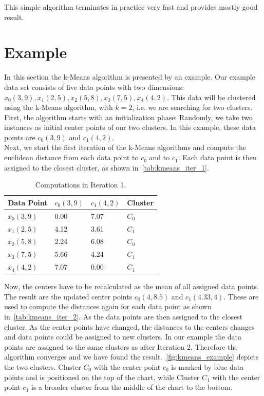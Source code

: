 This simple algorithm terminates in practice very fast and provides mostly good result.

\section{Example}

In this section the k-Means algorithm is presented by an example. Our example data set consists of five data points with two dimensions: $x_0(3,9), x_1(2,5), x_2(5,8), x_3(7,5), x_4(4,2)$. This data will be clustered using the k-Means algorithm, with $k = 2$, i.e. we are searching for two clusters. First, the algorithm starts with an initialization phase: Randomly, we take two instances as initial center points of our two clusters. In this example, these data points are $c_0(3,9)$ and $c_1(4,2)$. 
\\
Next, we start the first iteration of the k-Means algorithms and compute the euclidean distance from each data point to $c_0$ and to $c_1$. Each data point is then assigned to the closest cluster, as shown in~\autoref{tab:kmeans_iter_1}.

\begin{table}[htsb]
  \caption[Computations in Iteration 1]{Computations in Iteration 1.}\label{tab:kmeans_iter_1}
  \centering
  \begin{tabular}{l l l l}
    \toprule
      Data Point & $c_0(3,9)$ & $c_1(4,2)$ & Cluster \\
    \midrule
        $x_0(3,9)$ & 0.00 & 7.07 & $C_0$ \\
        $x_1(2,5)$ & 4.12 & 3.61 & $C_1$ \\
        $x_2(5,8)$ & 2.24 & 6.08 & $C_0$ \\
        $x_3(7,5)$ & 5.66 & 4.24 & $C_1$ \\
        $x_4(4,2)$ & 7.07 & 0.00 & $C_1$ \\
    \bottomrule
  \end{tabular}
\end{table}

Now, the centers have to be recalculated as the mean of all assigned data points. The result are the updated center points $c_0(4,8.5)$ and $c_1(4.33,4)$. These are used to compute the distances again for each data point as shown in~\autoref{tab:kmeans_iter_2}. As the data points are then assigned to the closest cluster. As the center points have changed, the distances to the centers changes and data points could be assigned to new clusters. In our example the data points are assigned to the same clusters as after Iteration 2. Therefore the algorithm converges and we have found the result.~\autoref{fig:kmeans_example} depicts the two clusters. Cluster $C_0$ with the center point $c_0$ is marked by blue data points and is positioned on the top of the chart, while Cluster $C_1$ with the center point $c_1$ is a broader cluster from the middle of the chart to the bottom.

